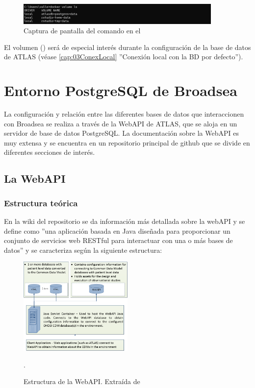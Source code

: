 \begin{figure}[H]
    \centering
    \includegraphics[width=0.90\textwidth]{figures/dockerVolumesCDM.png}
     \caption{Captura de pantalla del comando  en el }
    \label{fig:dockerVolumesCDM}
\end{figure}

El volumen  () será de especial interés durante la configuración de la base de datos de ATLAS (véase \ref{cap:03ConexLocal} ''Conexión local con la BD por defecto'').

\section{Entorno PostgreSQL de Broadsea}\label{sec:01Postgre}

La configuración y relación entre las diferentes bases de datos que interaccionen con Broadsea se realiza a través de la WebAPI de ATLAS, que se aloja en un servidor de base de datos PostgreSQL. La documentación sobre la WebAPI es muy extensa y se encuentra en un repositorio principal de github \parencite{githubWebAPI} que se divide en diferentes secciones de interés.

\subsection{La WebAPI} \label{subsec:01webapi}

\subsubsection{Estructura teórica}

En la wiki del repositorio \parencite{githubWebAPIwiki} se da información más detallada sobre la webAPI y se define como ''una aplicación basada en Java diseñada para proporcionar un conjunto de servicios web RESTful para interactuar con una o más bases de datos'' y se caracteriza según la siguiente estructura:

\begin{figure}[H]
    \centering
    \includegraphics[width=0.50\textwidth]{figures/webAPIwiki.png}
     \caption{Estructura de la WebAPI. Extraída de \parencite{githubWebAPIwiki}}.
    \label{fig:webAPIwiki}
\end{figure}

